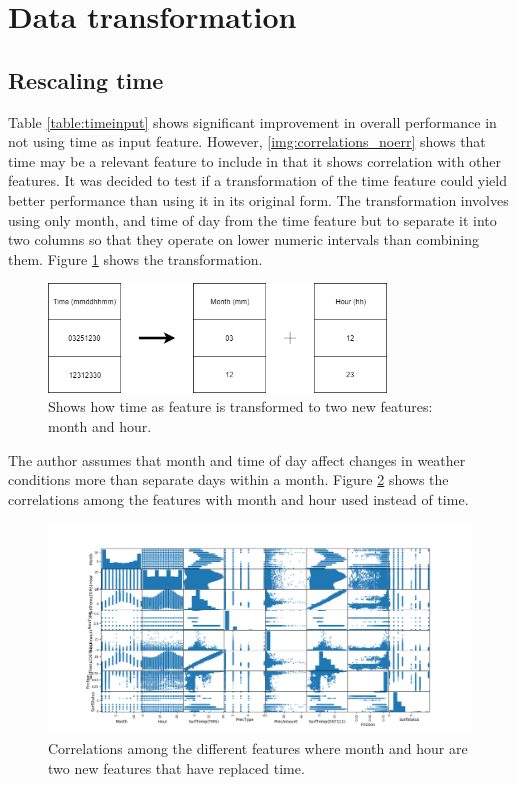 \section{Data transformation} \label{sec:transformation}

	\subsection{Rescaling time}

	Table \ref{table:timeinput} shows significant improvement in overall performance in not using time as input feature. However,  \ref{img:correlations_noerr} shows that time may be a relevant feature to include in that it shows correlation with other features. It was decided to test if a transformation of the time feature could yield better performance than using it in its original form. The transformation involves using only month, and time of day from the time feature but to separate it into two columns so that they operate on lower numeric intervals than combining them. Figure \ref{img:transformation} shows the transformation. 

\begin{figure}[H] 
	\centering
	\includegraphics[width=0.8\textwidth]{media/transformation_time.png}
	\caption{Shows how time as feature is transformed to two new features: month and hour.}
	\label{img:transformation}
\end{figure}

	The author assumes that month and time of day affect changes in weather conditions more than separate days within a month. Figure \ref{img:correlations_featureengi} shows the correlations among the features with month and hour used instead of time. 

\begin{figure}[H] 
	\centering
	\includegraphics[width=1\textwidth]{media/correlations_featureengi.png}
	\caption{Correlations among the different features where month and hour are two new features that have replaced time. }
	\label{img:correlations_featureengi}
\end{figure}

